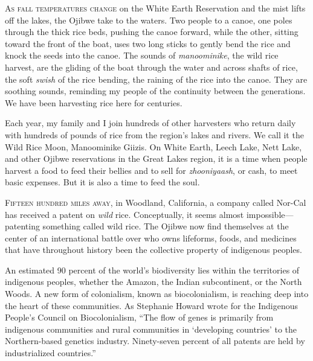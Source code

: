 
\textsc{As fall temperatures change} on the White Earth Reservation
and the mist lifts off the lakes, the Ojibwe take to the waters. Two
people to a canoe, one poles through the thick
rice beds, pushing the canoe forward, while the other, sitting toward
the front of the boat, uses two long sticks to gently bend the rice and
knock the seeds into the canoe. The sounds of \emph{manoominike}, the
wild rice harvest, are the gliding of the boat through the water and
across shafts of rice, the soft \emph{swish} of the rice bending, the
raining of the rice into the canoe. They are soothing sounds, reminding
my people of the continuity between the generations. We have been
harvesting rice here for centuries.

Each year, my family and I join hundreds of other harvesters who return
daily with hundreds of pounds of rice from the region's lakes and
rivers. We call it the Wild Rice Moon, Manoominike Giizis. On White
Earth, Leech Lake, Nett Lake, and other Ojibwe reservations in the Great
Lakes region, it is a time when people harvest a food to feed their
bellies and to sell for \emph{zhooniyaash}, or cash, to meet basic
expenses. But it is also a time to feed the soul.


\textsc{Fifteen hundred miles away}, in Woodland, California, a company
called Nor-Cal has received a patent on \emph{wild} rice. Conceptually,
it seems almost impossible---patenting something called wild rice. The
Ojibwe now find themselves at the center of an international battle over
who owns lifeforms, foods, and medicines that have throughout history
been the collective property of indigenous peoples.

An estimated 90 percent of the world's biodiversity lies within the
territories of indigenous peoples, whether the Amazon, the Indian
subcontinent, or the North Woods. A new form of colonialism, known as
biocolonialism, is reaching deep into the heart of these communities. As
Stephanie Howard wrote for the Indigenous People's Council on
Biocolonialism, ``The flow of genes is primarily from indigenous
communities and rural communities in `developing countries' to the
Northern-based genetics industry. Ninety-seven percent of all patents
are held by industrialized countries.''

